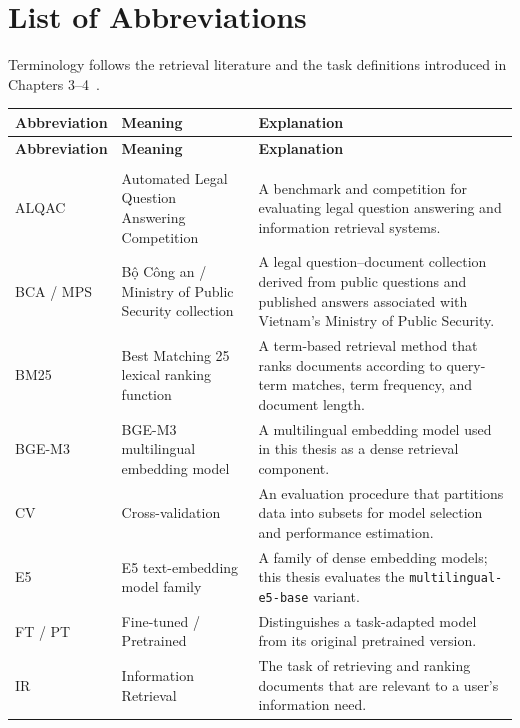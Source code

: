 \chapter*{List of Abbreviations}

Terminology follows the retrieval literature and the task definitions introduced in Chapters 3--4~\cite{manning2008,chen2024,wang2024,lewis2020}.

\begingroup
\small
\setlength{\tabcolsep}{3pt}
\renewcommand{\arraystretch}{1.18}
\begin{longtable}{>{\raggedright\arraybackslash}p{2.486cm}>{\raggedright\arraybackslash}p{5.073cm}>{\raggedright\arraybackslash}p{7.781cm}}
\toprule
\textbf{Abbreviation} & \textbf{Meaning} & \textbf{Explanation} \\
\midrule
\endfirsthead
\toprule
\textbf{Abbreviation} & \textbf{Meaning} & \textbf{Explanation} \\
\midrule
\endhead
\midrule
\multicolumn{3}{r}{\footnotesize Continued on next page}\\
\endfoot
\bottomrule
\endlastfoot
ALQAC & Automated Legal Question Answering Competition & A benchmark and competition for evaluating legal question answering and information retrieval systems. \\
BCA /\allowbreak{} MPS & Bộ Công an /\allowbreak{} Ministry of Public Security collection & A legal question--document collection derived from public questions and published answers associated with Vietnam's Ministry of Public Security. \\
BM25 & Best Matching 25 lexical ranking function & A term-based retrieval method that ranks documents according to query-term matches, term frequency, and document length. \\
BGE-M3 & BGE-M3 multilingual embedding model & A multilingual embedding model used in this thesis as a dense retrieval component. \\
CV & Cross-validation & An evaluation procedure that partitions data into subsets for model selection and performance estimation. \\
E5 & E5 text-embedding model family & A family of dense embedding models; this thesis evaluates the \texttt{multilin\allowbreak{}gual-e5-\allowbreak{}base} variant. \\
FT /\allowbreak{} PT & Fine-tuned /\allowbreak{} Pretrained & Distinguishes a task-adapted model from its original pretrained version. \\
IR & Information Retrieval & The task of retrieving and ranking documents that are relevant to a user's information need. \\

\end{longtable}
